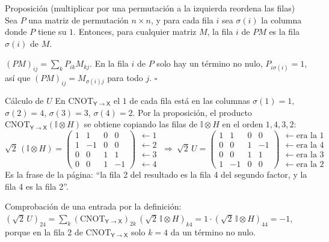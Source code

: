 \documentclass[11pt, a4paper, twoside, openright]{report}
\newcommand{\X}{\mathsf{X}}
\newcommand{\Y}{\mathsf{Y}}
\newcommand{\CYX}{\mathrm{CNOT}_{\Y\to\X}}
\newcommand{\I}{\mathbb{I}}
\begin{document}
\begin{teoria}{Proposición (multiplicar por una permutación a la izquierda reordena las filas)}
Sea $P$ una matriz de permutación $n\times n$, y para cada fila $i$ sea $\sigma(i)$ la columna donde $P$ tiene su $1$. Entonces, para cualquier matriz $M$, la fila $i$ de $PM$ es la fila $\sigma(i)$ de $M$.
\end{teoria}

\begin{demo}
$(PM)_{ij}=\sum_k P_{ik}M_{kj}$. En la fila $i$ de $P$ solo hay un término no nulo, $P_{i\sigma(i)}=1$, así que $(PM)_{ij}=M_{\sigma(i)j}$ para todo $j$. \hfill$\square$
\end{demo}

\begin{ejemplo}{Cálculo de $U$}
En $\CYX$ el $1$ de cada fila está en las columnas $\sigma(1)=1$, $\sigma(2)=4$, $\sigma(3)=3$, $\sigma(4)=2$. Por la proposición, el producto $\CYX(\I\otimes H)$ se obtiene copiando las filas de $\I\otimes H$ en el orden $1,4,3,2$:
\[
\sqrt2\,(\I\otimes H)=\begin{pmatrix} 1&1&0&0\\1&-1&0&0\\0&0&1&1\\0&0&1&-1\end{pmatrix}
\begin{array}{l}\leftarrow 1\\ \leftarrow 2\\ \leftarrow 3\\ \leftarrow 4\end{array}
\ \Longrightarrow\ 
\sqrt2\,U=\begin{pmatrix} 1&1&0&0\\0&0&1&-1\\0&0&1&1\\1&-1&0&0\end{pmatrix}
\begin{array}{l}\leftarrow\text{era la } 1\\ \leftarrow\text{era la } 4\\ \leftarrow\text{era la } 3\\ \leftarrow\text{era la } 2\end{array}
\]
Es la frase de la página: ``la fila 2 del resultado es la fila 4 del segundo factor, y la fila 4 es la fila 2''.

Comprobación de una entrada por la definición: $(\sqrt2\,U)_{24}=\sum_k (\CYX)_{2k}\,(\sqrt2\,\I\otimes H)_{k4}=1\cdot(\sqrt2\,\I\otimes H)_{44}=-1$, porque en la fila 2 de $\CYX$ solo $k=4$ da un término no nulo.
\end{ejemplo}
\end{document}
